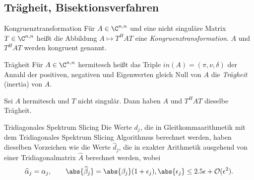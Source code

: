 \subsection{Trägheit, Bisektionsverfahren}

\begin{karte}{Kongruenztransformation}
    Für \( A\in \C^{n,n} \) und eine nicht singuläre Matrix \(T\in \C^{n,n}\) 
    heißt die Abbildung \( A \mapsto T^H A T \) eine \textit{Kongruenztransformation}. 
    \(A\) und \( T^H A T \) werden kongruent genannt.
\end{karte}

\begin{karte}{Trägheit}
    Für \( A\in \C^{n,n} \) hermitesch heißt das Triple \( in(A) = (\pi, \nu, \delta) \) 
    der Anzahl der positiven, negativen und Eigenwerten gleich Null von \(A\) 
    die \textit{Trägheit} (inertia) von \(A\).

    Sei \(A\) hermitesch und \(T\) nicht singulär. Dann haben \(A\) und \(T^H A T\) 
    dieselbe Trägheit.
\end{karte}

\begin{karte}{Tridiagonales Spektrum Slicing}
    Die Werte \(d_j\), die in Gleitkommaarithmetik mit dem Tridiagonales Spektrum Slicing Algorithmus 
    berechnet werden, haben dieselben Vorzeichen wie die Werte \( \widehat{d}_j \), 
    die in exakter Arithmetik ausgehend von einer Tridiagonalmatrix \(\widehat{A}\) 
    berechnet werden, wobei 
    \[ \widehat{\alpha}_j = \alpha_j, \qquad \abs{\widehat{\beta}_j} = \abs{\beta_j}(1+\epsilon_j), 
    \abs{\epsilon_j} \leq 2.5\epsilon + \mathcal{O}(\epsilon^2). \]
\end{karte}